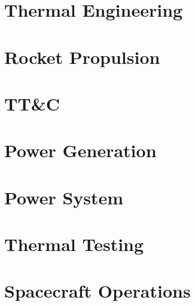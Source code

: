 \documentclass[a4paper,10pt]{article}
\begin{document}
\section{Thermal Engineering}

\section{Rocket Propulsion}

\section{TT\&C}

\section{Power Generation}

\section{Power System}

\section{Thermal Testing}

\section{Spacecraft Operations}
\end{document}
